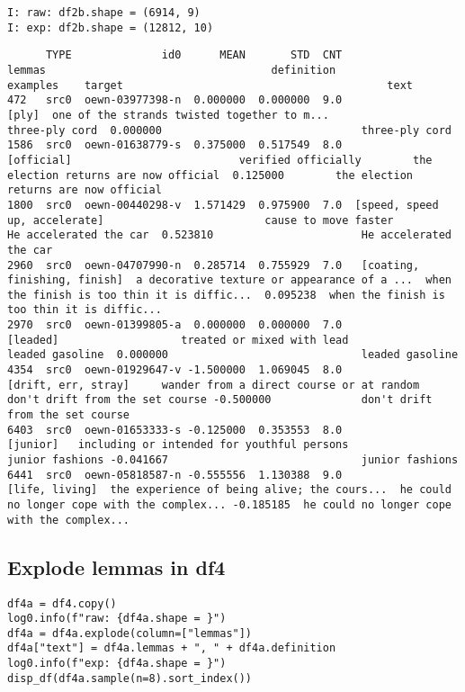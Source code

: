 \documentclass[a4paper,10pt,onecolumn,oneside,openright]{article}
\begin{document}
\begin{verbatim}
I: raw: df2b.shape = (6914, 9)
I: exp: df2b.shape = (12812, 10)
\end{verbatim}
\begin{verbatim}
      TYPE              id0      MEAN       STD  CNT                         lemmas                                   definition                                     examples    target                                         text
472   src0  oewn-03977398-n  0.000000  0.000000  9.0                          [ply]  one of the strands twisted together to m...                               three-ply cord  0.000000                               three-ply cord
1586  src0  oewn-01638779-s  0.375000  0.517549  8.0                     [official]                          verified officially        the election returns are now official  0.125000        the election returns are now official
1800  src0  oewn-00440298-v  1.571429  0.975900  7.0  [speed, speed up, accelerate]                         cause to move faster                       He accelerated the car  0.523810                       He accelerated the car
2960  src0  oewn-04707990-n  0.285714  0.755929  7.0   [coating, finishing, finish]  a decorative texture or appearance of a ...  when the finish is too thin it is diffic...  0.095238  when the finish is too thin it is diffic...
2970  src0  oewn-01399805-a  0.000000  0.000000  7.0                       [leaded]                   treated or mixed with lead                              leaded gasoline  0.000000                              leaded gasoline
4354  src0  oewn-01929647-v -1.500000  1.069045  8.0            [drift, err, stray]     wander from a direct course or at random              don't drift from the set course -0.500000              don't drift from the set course
6403  src0  oewn-01653333-s -0.125000  0.353553  8.0                       [junior]   including or intended for youthful persons                              junior fashions -0.041667                              junior fashions
6441  src0  oewn-05818587-n -0.555556  1.130388  9.0                 [life, living]  the experience of being alive; the cours...  he could no longer cope with the complex... -0.185185  he could no longer cope with the complex...
\end{verbatim}
\subsection{Explode lemmas in df4}
\label{sec:org53975ec}
\begin{verbatim}
df4a = df4.copy()
log0.info(f"raw: {df4a.shape = }")
df4a = df4a.explode(column=["lemmas"])
df4a["text"] = df4a.lemmas + ", " + df4a.definition
log0.info(f"exp: {df4a.shape = }")
disp_df(df4a.sample(n=8).sort_index())
\end{verbatim}
\end{document}
